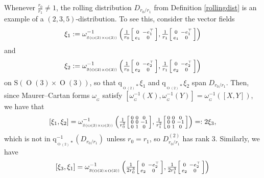 \documentclass[12pt,a4paper]{amsart}
\theoremstyle{definition}
\DeclareMathOperator{\Orth}{O}
\newcommand{\MC}[1]{\omega_{{}_{#1}}}
\newenvironment{smallbmatrix}
  {\left[\begin{smallmatrix}}
  {\end{smallmatrix}\right]}
\begin{document}

Whenever $\tfrac{r_0}{r_1}\neq 1$, the rolling distribution $D_{r_0/r_1}$ from Definition \ref{rollingdist} is an example of a $(2,3,5)$-distribution. To see this, consider the vector fields
\[\xi_1:=\MC{\mathrm{S}(\Orth(3)\times\Orth(3))}^{-1}\left(\tfrac{1}{r_0}\begin{smallbmatrix}0 & -e_1^\top \\ e_1 & 0\end{smallbmatrix}, \tfrac{1}{r_1}\begin{smallbmatrix}0 & -e_1^\top \\ e_1 & 0\end{smallbmatrix}\right)\]
and
\[\xi_2:=\MC{\mathrm{S}(\Orth(3)\times\Orth(3))}^{-1}\left(\tfrac{1}{r_0}\begin{smallbmatrix}0 & -e_2^\top \\ e_2 & 0\end{smallbmatrix}, \tfrac{1}{r_1}\begin{smallbmatrix}0 & -e_2^\top \\ e_2 & 0\end{smallbmatrix}\right)\]
on $\mathrm{S}(\Orth(3)\times\Orth(3))$, so that $\mathrm{q}_{{}_{\Orth(2)}*}\xi_1$ and $\mathrm{q}_{{}_{\Orth(2)}*}\xi_2$ span $D_{r_0/r_1}$. Then, since Maurer--Cartan forms $\MC{G}$ satisfy $[\MC{G}^{-1}(X),\MC{G}^{-1}(Y)]=\MC{G}^{-1}([X,Y])$, we have that
\[[\xi_1,\xi_2]=\MC{\mathrm{S}(\Orth(3)\times\Orth(3))}^{-1}\left(\tfrac{1}{r_0^2}\begin{smallbmatrix}0 & 0 & 0 \\ 0 & 0 & -1 \\ 0 & 1 & 0\end{smallbmatrix},\tfrac{1}{r_1^2}\begin{smallbmatrix}0 & 0 & 0 \\ 0 & 0 & -1 \\ 0 & 1 & 0\end{smallbmatrix}\right)=:2\xi_3,\]
which is not in $\mathrm{q}_{{}_{\Orth(2)}*}^{-1}(D_{r_0/r_1})$ unless $r_0=r_1$, so $D_{r_0/r_1}^{(2)}$ has rank 3. Similarly, we have
\[[\xi_3,\xi_1]=\MC{\mathrm{S}(\Orth(3)\times\Orth(3))}^{-1}\left(\tfrac{1}{2r_0^3}\begin{smallbmatrix}0 & -e_2^\top \\ e_2 & 0\end{smallbmatrix}, \tfrac{1}{2r_1^3}\begin{smallbmatrix}0 & -e_2^\top \\ e_2 & 0\end{smallbmatrix}\right)\]
\end{document}
